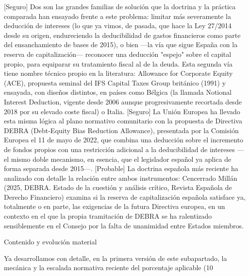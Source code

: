 \documentclass[10pt,a4paper]{article}
\begin{document}
[Seguro] Dos son las grandes familias de solución que la doctrina y la práctica comparada han ensayado frente a este problema: limitar más severamente la deducción de intereses (lo que ya vimos, de pasada, que hace la Ley 27/2014 desde su origen, endureciendo la deducibilidad de gastos financieros como parte del ensanchamiento de bases de 2015), o bien —la vía que sigue España con la reserva de capitalización— reconocer una deducción "espejo" sobre el capital propio, para equiparar su tratamiento fiscal al de la deuda. Esta segunda vía tiene nombre técnico propio en la literatura: Allowance for Corporate Equity (ACE), propuesta seminal del IFS Capital Taxes Group británico (1991) y ensayada, con diseños distintos, en países como Bélgica (la llamada Notional Interest Deduction, vigente desde 2006 aunque progresivamente recortada desde 2018 por su elevado coste fiscal) o Italia. [Seguro] La Unión Europea ha llevado esta misma lógica al plano normativo comunitario con la propuesta de Directiva DEBRA (Debt-Equity Bias Reduction Allowance), presentada por la Comisión Europea el 11 de mayo de 2022, que combina una deducción sobre el incremento de fondos propios con una restricción adicional a la deducibilidad de intereses —el mismo doble mecanismo, en esencia, que el legislador español ya aplica de forma separada desde 2015—. [Probable] La doctrina española más reciente ha analizado con detalle la relación entre ambos instrumentos: Cencerrado Millán (2025, DEBRA. Estado de la cuestión y análisis crítico, Revista Española de Derecho Financiero) examina si la reserva de capitalización española satisface ya, totalmente o en parte, las exigencias de la futura Directiva europea, en un contexto en el que la propia tramitación de DEBRA se ha ralentizado sensiblemente en el Consejo por la falta de unanimidad entre Estados miembros.

Contenido y evolución material

Ya desarrollamos con detalle, en la primera versión de este subapartado, la mecánica y la escalada normativa reciente del porcentaje aplicable (10%
\end{document}
